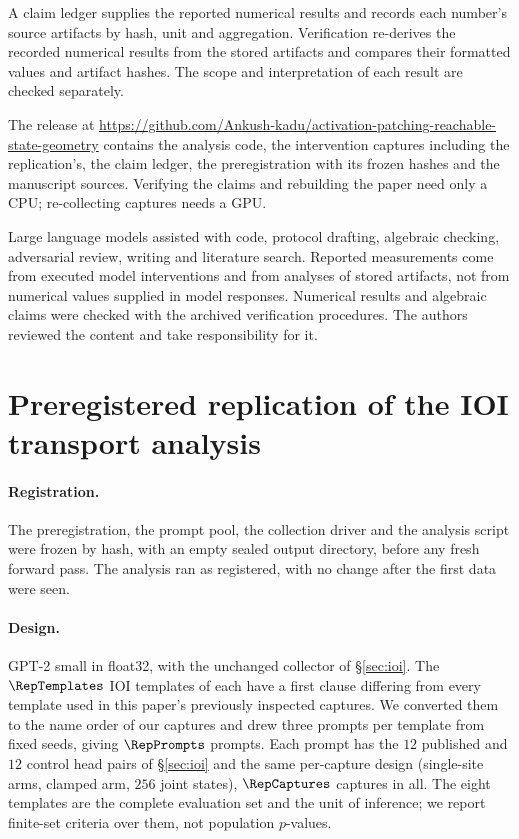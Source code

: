 A claim ledger supplies the reported numerical results and records each number's source artifacts by hash, unit
and aggregation. Verification re-derives the recorded numerical results from the stored artifacts and compares their formatted
values and artifact hashes. The scope and interpretation of each result are checked separately.

The release at
\url{https://github.com/Ankush-kadu/activation-patching-reachable-state-geometry} contains the analysis code, the
intervention captures including the replication's, the claim ledger, the preregistration with its frozen hashes and
the manuscript sources. Verifying the claims and rebuilding the paper need only a CPU; re-collecting captures needs a GPU.

Large language models assisted with code, protocol drafting, algebraic checking, adversarial review, writing and
literature search. Reported measurements come from executed model interventions and from analyses of stored
artifacts, not from numerical values supplied in model responses. Numerical results and algebraic claims were checked with the archived verification procedures.
The authors reviewed the content and take responsibility for it.

\section{Preregistered replication of the IOI transport analysis}
\label{app:replication}

\paragraph{Registration.} The preregistration, the prompt pool, the collection driver and the analysis script were
frozen by hash, with an empty sealed output directory, before any fresh forward pass. The analysis ran as
registered, with no change after the first data were seen.

\paragraph{Design.} GPT-2 small in float32, with the unchanged collector of \S\ref{sec:ioi}. The $\RepTemplates$ IOI templates of \citet{wang2022ioi} each have a first clause differing from every template
used in this paper's previously inspected captures. We converted them to the name order of our captures and drew
three prompts per template from fixed seeds, giving $\RepPrompts$ prompts. Each prompt has the $12$ published and $12$ control head pairs of
\S\ref{sec:ioi} and the same per-capture design (single-site arms, clamped arm, $256$ joint states), $\RepCaptures$
captures in all. The eight templates are the complete evaluation set and the unit of inference; we report finite-set
criteria over them, not population $p$-values.

